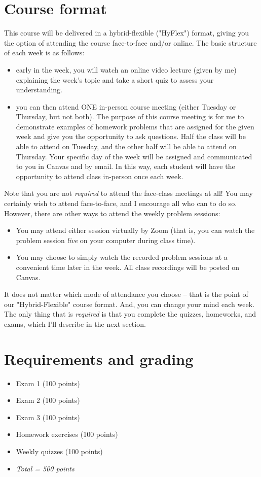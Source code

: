 \documentclass[10pt]{article}
\begin{document}
\section*{Course format}
\label{sec:orgcfafaeb}

This course will be delivered in a hybrid-flexible ("HyFlex") format, giving you the option of attending the course face-to-face and/or online. The basic structure of each week is as follows:

\begin{itemize}
\item early in the week, you will watch an online video lecture (given by me) explaining the week's topic and take a short quiz to assess your understanding.

\item you can then attend ONE in-person course meeting (either Tuesday or Thursday, but not both). The purpose of this course meeting is for me to demonstrate examples of homework problems that are assigned for the given week and give you the opportunity to ask questions. Half the class will be able to attend on Tuesday, and the other half will be able to attend on Thursday. Your specific day of the week will be assigned and communicated to you in Canvas and by email. In this way, each student will have the opportunity to attend class in-person once each week.
\end{itemize}

Note that you are not \emph{required} to attend the face-class meetings at all! You may certainly wish to attend face-to-face, and I encourage all who can to do so. However, there are other ways to attend the weekly problem sessions:
\begin{itemize}
\item You may attend either session virtually by Zoom (that is, you can watch the problem session \emph{live} on your computer during class time).
\item You may choose to simply watch the recorded problem sessions at a convenient time later in the week. All class recordings will be posted on Canvas.
\end{itemize}

It does not matter which mode of attendance you choose -- that is the point of our "Hybrid-Flexible" course format. And, you can change your mind each week. The only thing that is \emph{required} is that you complete the quizzes, homeworks, and exams, which I'll describe in the next section.

\section*{Requirements and grading}
\label{sec:orge2bf4bb}
\begin{itemize}
\item Exam 1 (100 points)
\item Exam 2 (100 points)
\item Exam 3 (100 points)
\item Homework exercises (100 points)
\item Weekly quizzes (100 points)
\item \emph{Total = 500 points}
\end{itemize}
\end{document}
